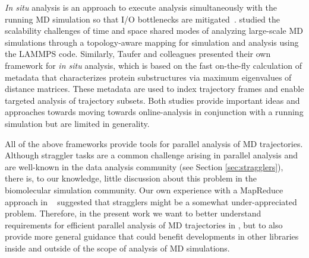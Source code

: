 \textit{In situ} analysis is an approach to execute analysis simultaneously with the running MD simulation so that I/O bottlenecks are  mitigated~\cite{Malakar-etal, Johnston:2017aa}.
\citet{Malakar-etal} studied the scalability challenges of time and space shared modes of analyzing large-scale MD simulations through a topology-aware mapping for simulation and analysis using the LAMMPS code.
Similarly, Taufer and colleagues \cite{Johnston:2017aa} presented their own framework for \textit{in situ} analysis, which is based on the fast on-the-fly calculation of metadata that characterizes protein substructures via maximum eigenvalues of distance matrices.
These metadata are used to index trajectory frames and enable targeted analysis of trajectory subsets.
Both studies provide important ideas and approaches towards moving towards online-analysis in conjunction with a running simulation but are limited in generality.

All of the above frameworks provide tools for parallel analysis of MD trajectories. 
Although straggler tasks are a common challenge arising in parallel analysis and are well-known in the data analysis community (see Section \ref{sec:stragglers}), there is, to our knowledge, little discussion about this problem in the biomolecular simulation community.
Our own experience with a MapReduce approach in ~\cite{Khoshlessan:2017ab} suggested that stragglers might be a somewhat under-appreciated problem.
Therefore, in the present work we want to better understand requirements for efficient parallel analysis of MD trajectories in , but to also provide more general guidance that could benefit developments in other libraries inside and outside of the scope of analysis of MD simulations.




